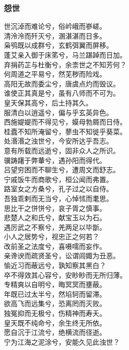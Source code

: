 \documentclass[]{article}
\begin{document}
\hypertarget{header-n2996}{%
\subsubsection{怨世}\label{header-n2996}}

世沉淖而难论兮，俗岒峨而嵾嵯。\\
清泠泠而歼灭兮，溷湛湛而日多。\\
枭鸮既以成群兮，玄鹤弭翼而屏移。\\
蓬艾亲入御于床笫兮，马兰踸踔而日加。\\
弃捐药芷与杜衡兮，余柰世之不知芳何？\\
何周道之平易兮，然芜秽而险戏。\\
高阳无故而委尘兮，唐虞点灼而毁议。\\
谁使正其真是兮，虽有八师而不可为。\\
皇天保其高兮，后土持其久。\\
服清白以逍遥兮，偏与乎玄英异色。\\
西施媞媞而不得见兮，嫫母勃屑而日侍。\\
桂蠹不知所淹留兮，蓼虫不知徙乎葵菜。\\
处湣湣之浊世兮，今安所达乎吾志。\\
意有所载而远逝兮，固非众人之所识。\\
骥踌躇于弊輂兮，遇孙阳而得代。\\
吕望穷困而不聊生兮，遭周文而舒志。\\
宁戚饭牛而商歌兮，桓公闻而弗置。\\
路室女之方桑兮，孔子过之以自侍。\\
吾独乖剌而无当兮，心悼怵而耄思。\\
思比干之恲恲兮，哀子胥之慎事。\\
悲楚人之和氏兮，献宝玉以为石。\\
遇厉武之不察兮，羌两足以毕斮。\\
小人之居势兮，视忠正之何若？\\
改前圣之法度兮，喜嗫嚅而妄作。\\
亲谗谀而疏贤圣兮，讼谓闾娵为丑恶。\\
愉近习而蔽远兮，孰知察其黑白？\\
卒不得效其心容兮，安眇眇而无所归薄。\\
专精爽以自明兮，晦冥冥而壅蔽。\\
年既已过太半兮，然埳轲而留滞。\\
欲高飞而远集兮，恐离罔而灭败。\\
独冤抑而无极兮，伤精神而寿夭。\\
皇天既不纯命兮，余生终无所依。\\
愿自沉于江流兮，绝横流而径逝。\\
宁为江海之泥涂兮，安能久见此浊世？
\end{document}
